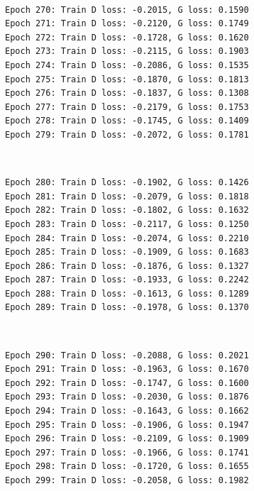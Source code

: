 \documentclass[11pt]{article}
\begin{document}
    \begin{center}
    \end{center}
    { \hspace*{\fill} \\}
    
    \begin{Verbatim}[commandchars=\\\{\}]
Epoch 270: Train D loss: -0.2015, G loss: 0.1590
Epoch 271: Train D loss: -0.2120, G loss: 0.1749
Epoch 272: Train D loss: -0.1728, G loss: 0.1620
Epoch 273: Train D loss: -0.2115, G loss: 0.1903
Epoch 274: Train D loss: -0.2086, G loss: 0.1535
Epoch 275: Train D loss: -0.1870, G loss: 0.1813
Epoch 276: Train D loss: -0.1837, G loss: 0.1308
Epoch 277: Train D loss: -0.2179, G loss: 0.1753
Epoch 278: Train D loss: -0.1745, G loss: 0.1409
Epoch 279: Train D loss: -0.2072, G loss: 0.1781

    \end{Verbatim}

    \begin{center}
    \end{center}
    { \hspace*{\fill} \\}
    
    \begin{Verbatim}[commandchars=\\\{\}]
Epoch 280: Train D loss: -0.1902, G loss: 0.1426
Epoch 281: Train D loss: -0.2079, G loss: 0.1818
Epoch 282: Train D loss: -0.1802, G loss: 0.1632
Epoch 283: Train D loss: -0.2117, G loss: 0.1250
Epoch 284: Train D loss: -0.2074, G loss: 0.2210
Epoch 285: Train D loss: -0.1909, G loss: 0.1683
Epoch 286: Train D loss: -0.1876, G loss: 0.1327
Epoch 287: Train D loss: -0.1933, G loss: 0.2242
Epoch 288: Train D loss: -0.1613, G loss: 0.1289
Epoch 289: Train D loss: -0.1978, G loss: 0.1370

    \end{Verbatim}

    \begin{center}
    \end{center}
    { \hspace*{\fill} \\}
    
    \begin{Verbatim}[commandchars=\\\{\}]
Epoch 290: Train D loss: -0.2088, G loss: 0.2021
Epoch 291: Train D loss: -0.1963, G loss: 0.1670
Epoch 292: Train D loss: -0.1747, G loss: 0.1600
Epoch 293: Train D loss: -0.2030, G loss: 0.1876
Epoch 294: Train D loss: -0.1643, G loss: 0.1662
Epoch 295: Train D loss: -0.1906, G loss: 0.1947
Epoch 296: Train D loss: -0.2109, G loss: 0.1909
Epoch 297: Train D loss: -0.1966, G loss: 0.1741
Epoch 298: Train D loss: -0.1720, G loss: 0.1655
Epoch 299: Train D loss: -0.2058, G loss: 0.1982

    \end{Verbatim}
\end{document}
